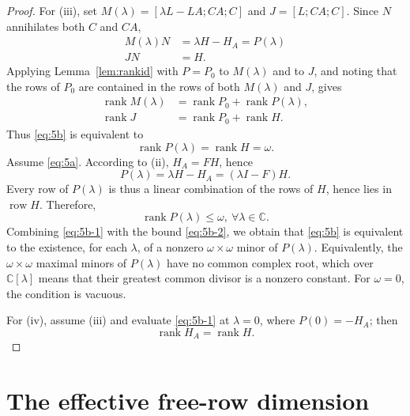 \documentclass[journal]{IEEEtran}
\theoremstyle{plainn}
\theoremstyle{remark}
\begin{document}
\begin{proof}
	For (iii), set $M(\lambda)=[\lambda L-LA;CA;C]$ and $J=[L;CA;C]$. Since $N$ annihilates both $C$ and $CA$,
	\begin{align*}
	M(\lambda)N&=\lambda H-H_A=P(\lambda)\\
	JN&=H.
	\end{align*}
	Applying Lemma~\ref{lem:rankid} with $P=P_0$ to $M(\lambda)$
	and to $J$, and noting that the rows of $P_0$ are contained in the
	rows of both $M(\lambda)$ and $J$, gives
	\begin{align*}
	\operatorname{rank}M(\lambda)
	&=
	\operatorname{rank}P_0+\operatorname{rank}P(\lambda),\\
	\operatorname{rank}J
	&=
	\operatorname{rank}P_0+\operatorname{rank}H.
	\end{align*}
	Thus \eqref{eq:5b} is equivalent to
	\begin{equation}\label{eq:5b-1}
		\operatorname{rank}P(\lambda)=\operatorname{rank}H=\omega.
	\end{equation}
  Assume \eqref{eq:5a}. According to (ii), $H_A=FH$, hence
  \begin{equation*}
  P(\lambda)=\lambda H-H_A=(\lambda I-F)H .
  \end{equation*}
  Every row of $P(\lambda)$ is thus a linear combination of the rows of $H$, hence
  lies in $\operatorname{row}H$. Therefore,
  \begin{equation}\label{eq:5b-2}
  \operatorname{rank}P(\lambda)\le \omega,\ \forall\lambda\in\mathbb C.
  \end{equation}
  Combining \eqref{eq:5b-1} with the bound \eqref{eq:5b-2}, we obtain that \eqref{eq:5b} is equivalent to the existence, for each $\lambda$, of a nonzero $\omega\times\omega$ minor of $P(\lambda)$.
  Equivalently, the $\omega\times\omega$ maximal minors of $P(\lambda)$ have no common complex root, which over $\mathbb C[\lambda]$ means that their greatest common divisor is a nonzero constant. For $\omega=0$, the condition is vacuous.
	
	For (iv), assume (iii) and evaluate \eqref{eq:5b-1} at $\lambda=0$, where $P(0)=-H_A$; then
	\begin{equation}
		\operatorname{rank}H_A=\operatorname{rank}H.
	\end{equation}
\end{proof}





\section{The effective free-row dimension}\label{sec:dimension}
\end{document}
